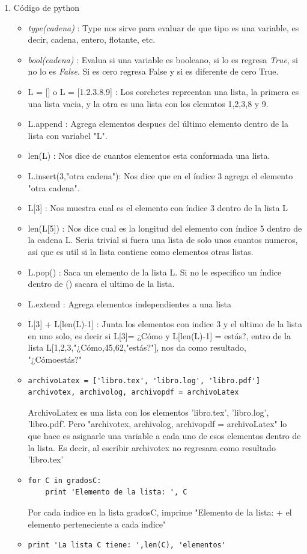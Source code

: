 \documentclass[letterpaper, 12pt,oneside]{article}
\begin{document}
\begin{enumerate}
		\item Código de python
			\begin{itemize}
				\item {\textit{type(cadena)}} : Type nos sirve para evaluar de que tipo es una variable, es decir, cadena, entero, flotante, etc.
				\item {\textit{bool(cadena)}} : Evalua si una variable es booleano, si lo es regresa {\textit{True}}, si no lo es {\textit{False}}. Si es cero regresa False y si es diferente de cero True.
				\item L = [] o L = [1.2.3.8.9] : Los corchetes repreentan una lista, la primera es una lista vacia, y la otra es una lista con los elemntos 1,2,3,8 y 9.
				\item L.append : Agrega elementos despues del último elemento dentro de la lista con variabel "L".
				\item len(L) : Nos dice de cuantos elementos esta conformada una lista.
				\item L.insert(3,"otra cadena"): Nos dice que  en el índice 3 agrega el elemento "otra cadena".
				\item L[3] : Nos muestra cual es el elemento con índice 3 dentro de la lista L
				\item len(L[5]) : Nos dice cual es la longitud del elemento con índice 5  dentro de la cadena L. Seria trivial si fuera una lista de solo unos cuantos numeros, asi que es util si la lista contiene como elementos otras listas.
				\item L.pop() : Saca un elemento de la lista L. Si no le especifico un índice dentro de () sacara el ultimo de la lista.
				\item L.extend : Agrega elementos independientes a una lista
				\item L[3] + L[len(L)-1] : Junta los elementos con indice 3 y el ultimo de la lista en uno solo, es decir si L[3]= ¿Cómo y L[len(L)-1] = estás?, entro de la lista L[1,2,3,"¿Cómo,45,62,"estás?"], nos da como resultado, "¿Cómoestás?"
				\item 
				\begin{lstlisting}
archivoLatex = ['libro.tex', 'libro.log', 'libro.pdf']
archivotex, archivolog, archivopdf = archivoLatex
				\end{lstlisting} ArchivoLatex es una lista con los elementos 'libro.tex', 'libro.log', 'libro.pdf'. Pero "archivotex, archivolog, archivopdf = archivoLatex" lo que hace es asignarle una variable a cada uno de esos elementos dentro de la lista. Es decir, al escribir archivotex no regresara como resultado 'libro.tex'
				\item 
				\begin{lstlisting}
for C in gradosC:
	print 'Elemento de la lista: ', C
				\end{lstlisting} Por cada indice en la lista gradosC, imprime "Elemento de la lista: + el elemento perteneciente a cada indice" 
				\item 
				\begin{lstlisting}
print 'La lista C tiene: ',len(C), 'elementos'
				\end{lstlisting} ~
				

\end{itemize}
\end{enumerate}
\end{document}
